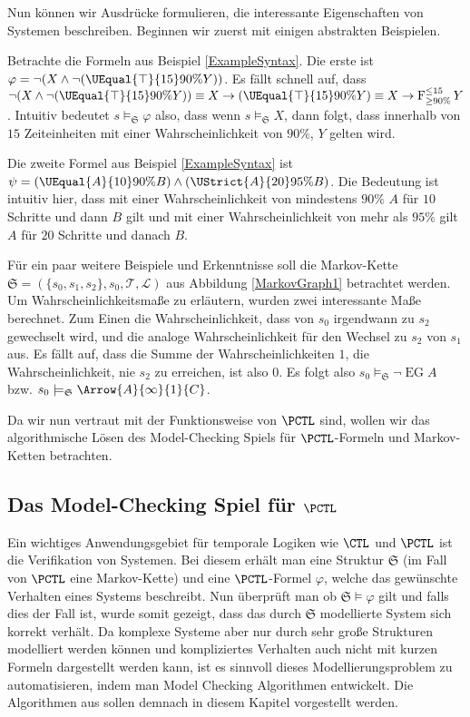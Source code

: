 Nun können wir Ausdrücke formulieren, die interessante Eigenschaften von Systemen beschreiben. Beginnen wir zuerst mit einigen abstrakten Beispielen.
\begin{example}
	\label{PCTLBeispiel}
	Betrachte die Formeln aus Beispiel \ref{ExampleSyntax}. Die erste ist $\varphi = \neg(X \land \neg(\UEqual{\top}{15}{90\%}{Y}))$.
	Es fällt schnell auf, dass $\neg(X \land \neg(\UEqual{\top}{15}{90\%}{Y})) \equiv X \rightarrow (\UEqual{\top}{15}{90\%}{Y}) \equiv X \rightarrow \operatorname{F}^{\leq 15}_{\geq 90\%}Y$.
	Intuitiv bedeutet $s\models_\mathfrak{S} \varphi$ also, dass wenn $s\models_\mathfrak{S} X$, dann folgt, dass innerhalb von $15$ Zeiteinheiten mit einer Wahrscheinlichkeit von $90\%$, $Y$ gelten wird.
	
	Die zweite Formel aus Beispiel \ref{ExampleSyntax} ist $\psi=(\UEqual{A}{10}{90\%}{B})\land(\UStrict{A}{20}{95\%}{B})$. 
	Die Bedeutung ist intuitiv hier, dass mit einer Wahrscheinlichkeit von mindestens $90\%$ $A$ für $10$ Schritte und dann $B$ gilt und mit einer Wahrscheinlichkeit von mehr als $95\%$ gilt $A$ für $20$ Schritte und danach $B$.
	
	Für ein paar weitere Beispiele und Erkenntnisse soll die Markov-Kette $\mathfrak{S}=(\{s_0, s_1,s_2\}, s_0, \mathcal{T},\mathcal{L})$ aus Abbildung \ref{MarkovGraph1} betrachtet werden.
	Um Wahrscheinlichkeitsmaße zu erläutern, wurden zwei interessante Maße berechnet. 
	Zum Einen die Wahrscheinlichkeit, dass von $s_0$ irgendwann zu $s_2$ gewechselt wird, und die analoge Wahrscheinlichkeit für den Wechsel zu $s_2$ von $s_1$ aus. 
	Es fällt auf, dass die Summe der Wahrscheinlichkeiten $1$, die Wahrscheinlichkeit, nie $s_2$ zu erreichen, ist also $0$.
	Es folgt also $s_0\models_\mathfrak{S} \neg\operatorname{EG}A$ bzw. $s_0\models_\mathfrak{S} \Arrow{A}{\infty}{1}{C}$.
\end{example}

Da wir nun vertraut mit der Funktionsweise von $\PCTL$ sind, wollen wir das algorithmische Lösen des Model-Checking Spiels für $\PCTL$-Formeln und Markov-Ketten betrachten.

\subsection{Das Model-Checking Spiel für $\PCTL$}
\label{ChapMCAlgs}

Ein wichtiges Anwendungsgebiet für temporale Logiken wie $\CTL$ und $\PCTL$ ist die Verifikation von Systemen. 
Bei diesem erhält man eine Struktur $\mathfrak{S}$ (im Fall von $\PCTL$ eine Markov-Kette) und eine $\PCTL$-Formel $\varphi$, welche das gewünschte Verhalten eines Systems beschreibt. 
Nun überprüft man ob $\mathfrak{S}\models \varphi$ gilt und falls dies der Fall ist, wurde somit gezeigt, dass das durch $\mathfrak{S}$ modellierte System sich korrekt verhält.
Da komplexe Systeme aber nur durch sehr große Strukturen modelliert werden können und kompliziertes Verhalten auch nicht mit kurzen Formeln dargestellt werden kann, ist es sinnvoll dieses Modellierungsproblem zu automatisieren, indem man Model Checking Algorithmen entwickelt. 
Die Algorithmen aus \cite{hansson1994logic} sollen demnach in diesem Kapitel vorgestellt werden.

